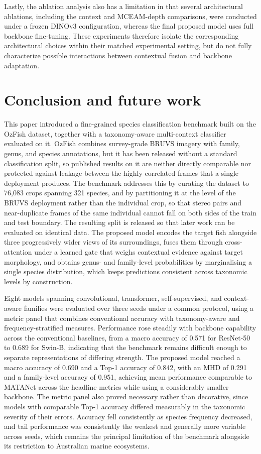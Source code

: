 \documentclass[preprint,12pt]{elsarticle}
\begin{document}
Lastly, the ablation analysis also has a limitation in that several
architectural ablations, including the context and MCEAM-depth
comparisons, were conducted under a frozen DINOv3 configuration, whereas
the final proposed model uses full backbone fine-tuning. These
experiments therefore isolate the corresponding architectural choices
within their matched experimental setting, but do not fully characterize
possible interactions between contextual fusion and backbone adaptation.

\section{Conclusion and future
work}\label{conclusion-and-future-work}

This paper introduced a fine-grained species classification benchmark
built on the OzFish dataset, together with a taxonomy-aware
multi-context classifier evaluated on it. OzFish combines survey-grade
BRUVS imagery with family, genus, and species annotations, but it has
been released without a standard classification split, so published
results on it are neither directly comparable nor protected against
leakage between the highly correlated frames that a single deployment
produces. The benchmark addresses this by curating the dataset to 76,083
crops spanning 321 species, and by partitioning it at the level of the
BRUVS deployment rather than the individual crop, so that stereo pairs
and near-duplicate frames of the same individual cannot fall on both
sides of the train and test boundary. The resulting split is released so
that later work can be evaluated on identical data. The proposed model
encodes the target fish alongside three progressively wider views of its
surroundings, fuses them through cross-attention under a learned gate
that weighs contextual evidence against target morphology, and obtains
genus- and family-level probabilities by marginalising a single species
distribution, which keeps predictions consistent across taxonomic levels
by construction.

Eight models spanning convolutional, transformer, self-supervised, and
context-aware families were evaluated over three seeds under a common
protocol, using a metric panel that combines conventional accuracy with
taxonomy-aware and frequency-stratified measures. Performance rose
steadily with backbone capability across the conventional baselines,
from a macro accuracy of 0.571 for ResNet-50 to 0.689 for Swin-B,
indicating that the benchmark remains difficult enough to separate
representations of differing strength. The proposed model reached a
macro accuracy of 0.690 and a Top-1 accuracy of 0.842, with an MHD of
0.291 and a family-level accuracy of 0.951, achieving mean performance
comparable to MATANet across the headline metrics while using a
considerably smaller backbone. The metric panel also proved necessary
rather than decorative, since models with comparable Top-1 accuracy
differed measurably in the taxonomic severity of their errors. Accuracy
fell consistently as species frequency decreased, and tail performance
was consistently the weakest and generally more variable across seeds,
which remains the principal limitation of the benchmark alongside its
restriction to Australian marine ecosystems.
\end{document}
